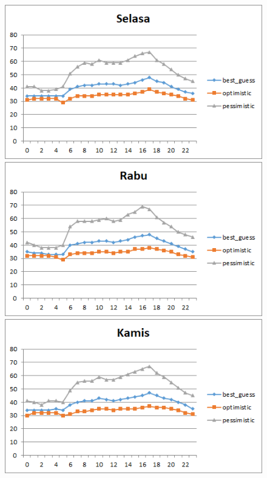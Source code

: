\begin{figure}[H]
				\centering		
				\includegraphics[]{Gambar/selasasampel217072017reverse.png}
				\includegraphics[]{Gambar/rabusampel217072017reverse.png}
				\includegraphics[]{Gambar/kamissampel217072017reverse.png}
\end{figure}			
			
